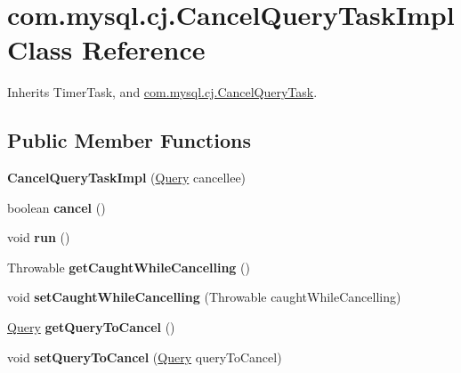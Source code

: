 \hypertarget{classcom_1_1mysql_1_1cj_1_1_cancel_query_task_impl}{}\section{com.\+mysql.\+cj.\+Cancel\+Query\+Task\+Impl Class Reference}
\label{classcom_1_1mysql_1_1cj_1_1_cancel_query_task_impl}


Inherits Timer\+Task, and \mbox{\hyperlink{interfacecom_1_1mysql_1_1cj_1_1_cancel_query_task}{com.\+mysql.\+cj.\+Cancel\+Query\+Task}}.

\subsection*{Public Member Functions}
\begin{DoxyCompactItemize}
\item 
\mbox{\label{classcom_1_1mysql_1_1cj_1_1_cancel_query_task_impl_a9a2ee8d146a3c365162fe26c214aa440}} 
{\bfseries Cancel\+Query\+Task\+Impl} (\mbox{\hyperlink{interfacecom_1_1mysql_1_1cj_1_1_query}{Query}} cancellee)
\item 
\mbox{\label{classcom_1_1mysql_1_1cj_1_1_cancel_query_task_impl_aa279eeabcc803503e806f552ee3fd46a}} 
boolean {\bfseries cancel} ()
\item 
\mbox{\label{classcom_1_1mysql_1_1cj_1_1_cancel_query_task_impl_aca7be2b8368718d9f3901e44256385cb}} 
void {\bfseries run} ()
\item 
\mbox{\label{classcom_1_1mysql_1_1cj_1_1_cancel_query_task_impl_a15fc1cf4ae9eaf9fdaa427bae226b210}} 
Throwable {\bfseries get\+Caught\+While\+Cancelling} ()
\item 
\mbox{\label{classcom_1_1mysql_1_1cj_1_1_cancel_query_task_impl_a6ed7124ec0547111f98f3d9c32c0046f}} 
void {\bfseries set\+Caught\+While\+Cancelling} (Throwable caught\+While\+Cancelling)
\item 
\mbox{\label{classcom_1_1mysql_1_1cj_1_1_cancel_query_task_impl_ac478b7b9bd6ffb2803fbaf31d5e28943}} 
\mbox{\hyperlink{interfacecom_1_1mysql_1_1cj_1_1_query}{Query}} {\bfseries get\+Query\+To\+Cancel} ()
\item 
\mbox{\label{classcom_1_1mysql_1_1cj_1_1_cancel_query_task_impl_a8091c01445defc1368fb90fab42eca5d}} 
void {\bfseries set\+Query\+To\+Cancel} (\mbox{\hyperlink{interfacecom_1_1mysql_1_1cj_1_1_query}{Query}} query\+To\+Cancel)
\end{DoxyCompactItemize}


